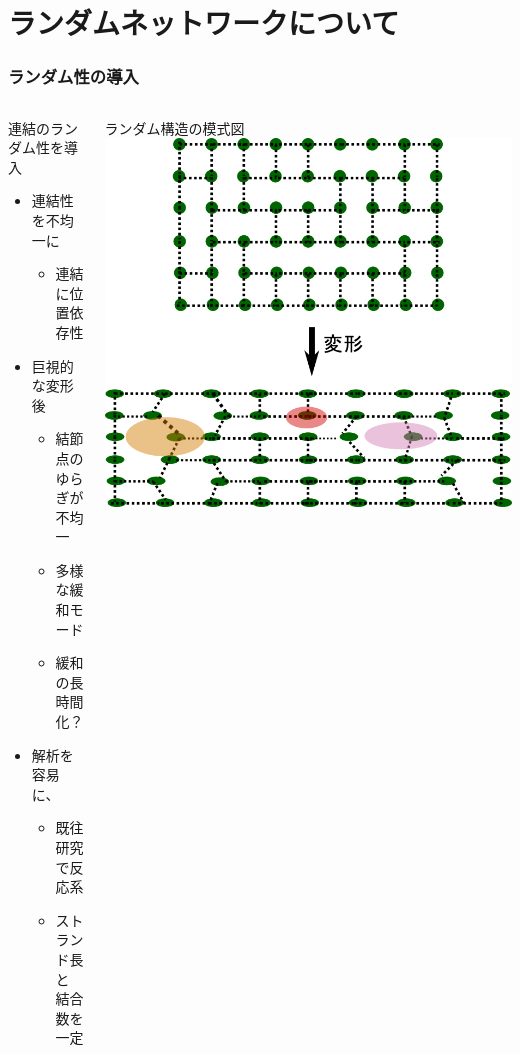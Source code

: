 \documentclass[12pt, dvipdfmx]{beamer}
\begin{document}
\section{ランダムネットワークについて}

\begin{frame}
    \frametitle{ランダム性の導入}
    \vspace{-3mm}
		\begin{columns}[totalwidth=1\textwidth]
				\begin{block}{連結のランダム性を導入}
					\begin{itemize}
						\item 連結性を不均一に
							\begin{itemize}
								\item 連結に\alert{位置依存性}
							\end{itemize}
						\item 巨視的な変形後
							\begin{itemize}
								\item 結節点のゆらぎが\\不均一
								\item 多様な緩和モード
								\item \alert{緩和の長時間化？}
							\end{itemize}
						\item \alert{解析を容易}に、
                            \begin{itemize}
                                \item 既往研究で反応系
								\item \alert{ストランド長と\\結合数を一定}
							\end{itemize}
					\end{itemize}
				\end{block}
				ランダム構造の模式図
				\vspace{5mm}
				\includegraphics[width=\textwidth]{random_NW.png}

\end{columns}
\end{frame}
\end{document}
